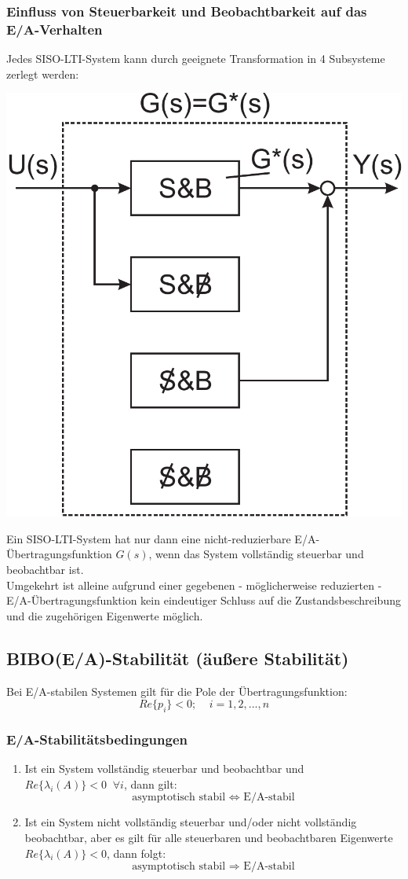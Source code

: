 \documentclass[a4paper,twocolumn,10pt]{article}
\begin{document}
\subsubsection{Einfluss von Steuerbarkeit und Beobachtbarkeit auf das E/A-Verhalten}
Jedes SISO-LTI-System kann durch geeignete Transformation in 4 Subsysteme zerlegt werden:
\begin{center}
\includegraphics[width=0.6\columnwidth]{Grafiken/Aufteilung_SISO}
\end{center}
Ein SISO-LTI-System hat nur dann eine nicht-reduzierbare E/A-Übertragungsfunktion $G(s)$, wenn das System vollständig steuerbar und beobachtbar ist.\\
Umgekehrt ist alleine aufgrund einer gegebenen - möglicherweise reduzierten - E/A-Übertragungsfunktion kein eindeutiger Schluss auf die Zustandsbeschreibung und die zugehörigen Eigenwerte möglich.

\subsection{BIBO(E/A)-Stabilität (äußere Stabilität)}
Bei E/A-stabilen Systemen gilt für die Pole der Übertragungsfunktion:
\begin{equation*}
Re\{p_i\}<0;\;\;\;\;i=1,2,...,n
\end{equation*}

\subsubsection{E/A-Stabilitätsbedingungen}
\begin{enumerate}[label= $\bullet$]
\item Ist ein System vollständig steuerbar und beobachtbar und $Re\{\lambda_i(A)\}<0\;\;\forall i$, dann gilt:
\begin{equation*}
\text{asymptotisch stabil }\Leftrightarrow\text{ E/A-stabil}
\end{equation*}
\item Ist ein System nicht vollständig steuerbar und/oder nicht vollständig beobachtbar, aber es gilt für alle steuerbaren und beobachtbaren Eigenwerte $Re\{\lambda_i(A)\}<0$, dann folgt:
\begin{equation*}
\text{asymptotisch stabil }\Rightarrow\text{ E/A-stabil}
\end{equation*}
\end{enumerate}
\end{document}
